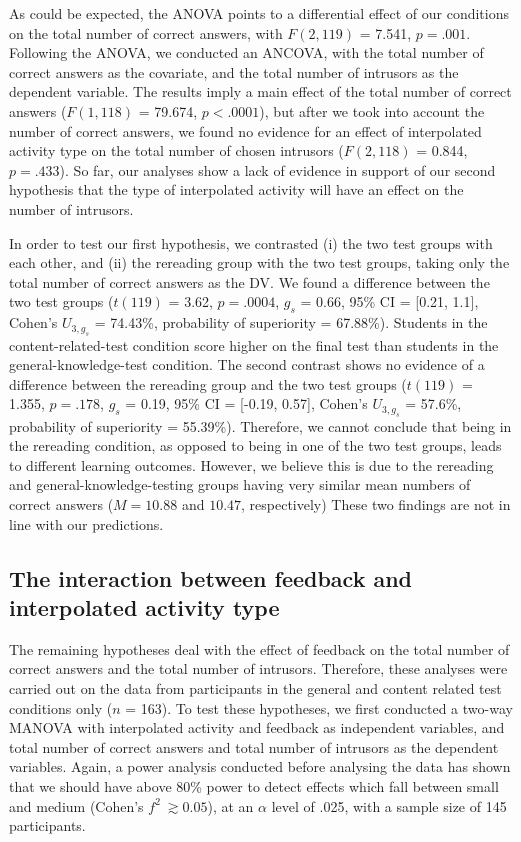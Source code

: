 As could be expected, the ANOVA points to a differential effect of our
conditions on the total number of correct answers, with \(F(2, 119)\) =
7.541, \(p = .001\). Following the ANOVA, we conducted an ANCOVA, with
the total number of correct answers as the covariate, and the total
number of intrusors as the dependent variable. The results imply a main
effect of the total number of correct answers (\(F(1, 118)\) = 79.674,
\(p < .0001\)), but after we took into account the number of correct
answers, we found no evidence for an effect of interpolated activity
type on the total number of chosen intrusors (\(F (2, 118)\) = 0.844,
\(p = .433\)). So far, our analyses show a lack of evidence in support
of our second hypothesis that the type of interpolated activity will
have an effect on the number of intrusors.

In order to test our first hypothesis, we contrasted (i) the two test
groups with each other, and (ii) the rereading group with the two test
groups, taking only the total number of correct answers as the DV. We
found a difference between the two test groups (\(t(119)\) = 3.62,
\(p = .0004\), \(g_s\) = 0.66, 95\% CI = {[}0.21, 1.1{]}, Cohen's
\(U_{3, g_s}\) = 74.43\%, probability of superiority = 67.88\%).
Students in the content-related-test condition score higher on the final
test than students in the general-knowledge-test condition. The second
contrast shows no evidence of a difference between the rereading group
and the two test groups (\(t(119)\) = 1.355, \(p = .178\), \(g_s\) =
0.19, 95\% CI = {[}-0.19, 0.57{]}, Cohen's \(U_{3, g_s}\) = 57.6\%,
probability of superiority = 55.39\%). Therefore, we cannot conclude
that being in the rereading condition, as opposed to being in one of the
two test groups, leads to different learning outcomes. However, we
believe this is due to the rereading and general-knowledge-testing
groups having very similar mean numbers of correct answers
(\(M = 10.88\) and \(10.47\), respectively) These two findings are not
in line with our predictions.

\hypertarget{the-interaction-between-feedback-and-interpolated-activity-type}{%
\subsection{The interaction between feedback and interpolated activity
type}\label{the-interaction-between-feedback-and-interpolated-activity-type}}

The remaining hypotheses deal with the effect of feedback on the total
number of correct answers and the total number of intrusors. Therefore,
these analyses were carried out on the data from participants in the
general and content related test conditions only (\(n\) = 163). To test
these hypotheses, we first conducted a two-way MANOVA with interpolated
activity and feedback as independent variables, and total number of
correct answers and total number of intrusors as the dependent
variables. Again, a power analysis conducted before analysing the data
has shown that we should have above 80\% power to detect effects which
fall between small and medium (Cohen's \(f^2\ \gtrsim 0.05\)), at an
\(\alpha\) level of .025, with a sample size of 145 participants.

